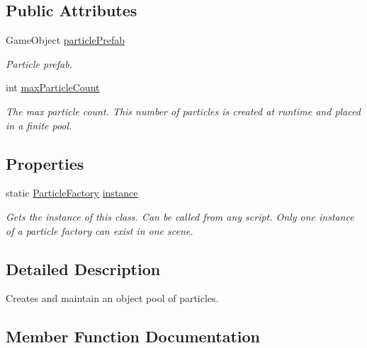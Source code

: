 \subsection*{Public Attributes}
\begin{DoxyCompactItemize}
\item 
Game\+Object \hyperlink{class_p_e2_d_1_1_particle_factory_a7431706eb3ca0363ebfa1936384fa8ca}{particle\+Prefab}
\begin{DoxyCompactList}\small\item\em Particle prefab. \end{DoxyCompactList}\item 
int \hyperlink{class_p_e2_d_1_1_particle_factory_a7a8905551b65537a74461cddeaaac5d3}{max\+Particle\+Count}
\begin{DoxyCompactList}\small\item\em The max particle count. This number of particles is created at runtime and placed in a finite pool. \end{DoxyCompactList}\end{DoxyCompactItemize}
\subsection*{Properties}
\begin{DoxyCompactItemize}
\item 
static \hyperlink{class_p_e2_d_1_1_particle_factory}{Particle\+Factory} \hyperlink{class_p_e2_d_1_1_particle_factory_a5ee02796828431320c6f8a70a8456feb}{instance}
\begin{DoxyCompactList}\small\item\em Gets the instance of this class. Can be called from any script. Only one instance of a particle factory can exist in one scene. \end{DoxyCompactList}\end{DoxyCompactItemize}


\subsection{Detailed Description}
Creates and maintain an object pool of particles. 



\subsection{Member Function Documentation}
\hypertarget{class_p_e2_d_1_1_particle_factory_a5d0fd6f0ecf11f2545ff889e02eaf09a}{}
